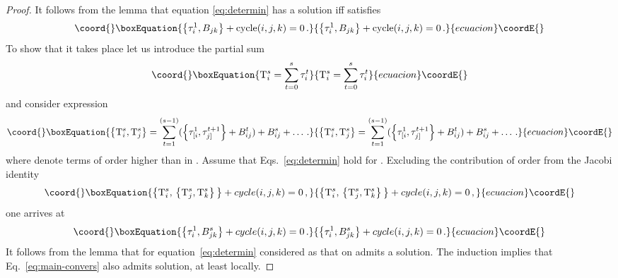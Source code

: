 \documentclass[a4paper,11pt,oneside]{amsart}
\theoremstyle{plain}
\numberwithin{equation}{section} %
\numberwithin{figure}{section} %
\providecommand{\pb}[2]{\left\{{}#1{},{}#2{}\right\}}
\def\cT{{\rm T}}
\begin{document}
\begin{proof}
\noindent
It follows from the lemma that equation
\eqref{eq:determin} has a solution iff \coordHE{}
satisfies
\begin{equation}\coord{}\boxEquation{
\pb{\tau^1_i}{B_{jk}}+{\rm cycle}(i,j,k)=0\,.
}{
\pb{\tau^1_i}{B_{jk}}+{\rm cycle}(i,j,k)=0\,.
}{ecuacion}\coordE{}\end{equation}
To show that it takes place let us introduce the partial sum
\begin{equation}\coord{}\boxEquation{
  \cT^s_i=\sum_{t=0}^s \tau^t_i
}{
  \cT^s_i=\sum_{t=0}^s \tau^t_i
}{ecuacion}\coordE{}\end{equation}
and consider expression
\begin{equation}\coord{}\boxEquation{
  \pb{\cT^s_i}{\cT^s_j}=\sum_{t=1}^{(s-1)}
(\pb{\tau^1_{[ i}}{\tau^{t+1}_{j ]}}+
B^t_{ij})+B^s_{ij}+ \ldots \,.
}{
  \pb{\cT^s_i}{\cT^s_j}=\sum_{t=1}^{(s-1)}
(\pb{\tau^1_{[ i}}{\tau^{t+1}_{j ]}}+
B^t_{ij})+B^s_{ij}+ \ldots \,.
}{ecuacion}\coordE{}\end{equation}
where \myHighlight{$\ldots$}\coordHE{} denote terms of order higher
than \coordHE{} in \coordHE{}.  Assume that Eqs.~\eqref{eq:determin}
hold for \coordHE{}.  Excluding the contribution of
order \coordHE{} from the Jacobi
identity
\begin{equation}\coord{}\boxEquation{
  \pb{\cT^s_i}{\pb{\cT^s_j}{\cT^s_k}}+cycle(i,j,k)=0\,,
}{
  \pb{\cT^s_i}{\pb{\cT^s_j}{\cT^s_k}}+cycle(i,j,k)=0\,,
}{ecuacion}\coordE{}\end{equation}
one arrives at
\begin{equation}\coord{}\boxEquation{
  \label{eq:comp}
\pb{\tau^1_i}{B^s_{jk}}+cycle(i,j,k)=0\,.
}{
  \pb{\tau^1_i}{B^s_{jk}}+cycle(i,j,k)=0\,.
}{ecuacion}\coordE{}\end{equation}
It follows from the lemma that for \coordHE{} equation~\eqref{eq:determin}
considered as that on \coordHE{}  admits a
solution.  The induction implies that Eq.~\eqref{eq:main-convers}
also admits solution, at least locally.


\end{proof}
\end{document}
